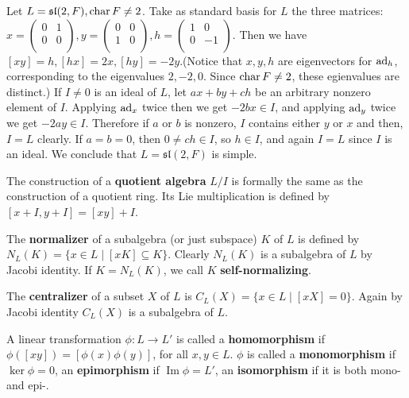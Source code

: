 \begin{example}
    Let $L=\mathfrak{sl}(2,F),\operatorname{char} F\neq 2$. Take as standard basis for $L$ the three matrices: $x=\begin{pmatrix}
        0 & 1 \\
        0 & 0 \\
    \end{pmatrix},y=\begin{pmatrix}
        0 & 0 \\
        1 & 0 \\
    \end{pmatrix},h=\begin{pmatrix}
        1 & 0 \\
        0 & -1 \\
    \end{pmatrix}$. Then we have $[xy]=h,[hx]=2x,[hy]=-2y$.(Notice that $x,y,h$ are eigenvectors for $\operatorname{ad}_h$, corresponding to the eigenvalues $2,-2,0$. Since $\operatorname{char} F\neq 2$, these egienvalues are distinct.) If $I\neq 0$ is an ideal of $L$, let $ax+by+ch$ be an arbitrary nonzero element of $I$. Applying $\operatorname{ad}_x$ twice then we get $-2bx \in I$, and applying $\operatorname{ad}_y$ twice we get $-2ay \in I$. Therefore if $a$ or $b$ is nonzero, $I$ contains either $y$ or $x$ and then, $I=L$ clearly. If $a=b=0$, then $0\neq ch \in I$, so $h \in I$, and again $I=L$ since $I$ is an ideal. We conclude that $L=\mathfrak{sl}(2,F)$ is simple.
\end{example}

The construction of a \textbf{quotient algebra} $L/I$ is formally the same as the construction of a quotient ring. Its Lie multiplication is defined by $[x+I,y+I]=[xy]+I$.

\begin{definition}
    The \textbf{normalizer} of a subalgebra (or just subspace) $K$ of $L$ is defined by $N_L(K)=\{ x\in L \mid [xK]\subseteq K \}$. Clearly $N_L(K)$ is a subalgebra of $L$ by Jacobi identity. If $K=N_L(K)$, we call $K$ \textbf{self-normalizing}.

    The \textbf{centralizer} of a subset $X$ of $L$ is $C_L(X)=\{ x\in L \mid [xX]=0 \}$. Again by Jacobi identity $C_L(X)$ is a subalgebra of $L$.
\end{definition}

\begin{definition}
    A linear transformation $\phi:L\to L'$ is called a \textbf{homomorphism} if $\phi([xy])=[\phi(x)\phi(y)]$, for all $x,y \in L$. $\phi$ is called a \textbf{monomorphism} if $\operatorname{ker} \phi=0$, an \textbf{epimorphism} if $\operatorname{Im} \phi=L'$, an \textbf{isomorphism} if it is both mono- and epi-. 
\end{definition}

